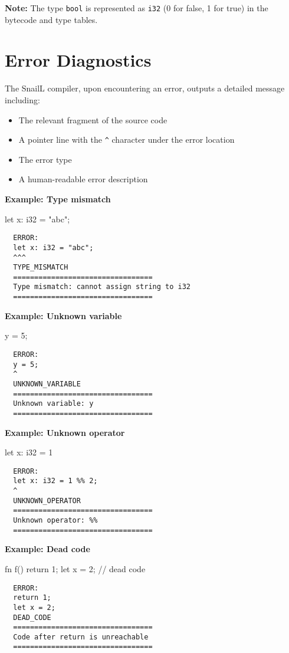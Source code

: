 \documentclass[a4paper,12pt]{article}
\begin{document}
    \textbf{Note:} The type \texttt{bool} is represented as \texttt{i32} (0 for false, 1 for true) in the bytecode and type tables.

    \section{Error Diagnostics}

    The SnailL compiler, upon encountering an error, outputs a detailed message including:
    \begin{itemize}
        \item The relevant fragment of the source code
        \item A pointer line with the \texttt{^} character under the error location
        \item The error type
        \item A human-readable error description
    \end{itemize}

    \textbf{Example: Type mismatch}
    \begin{snailcode}
        let x: i32 = "abc";
    \end{snailcode}
    \begin{verbatim}
  ERROR:
  let x: i32 = "abc";
  ^^^
  TYPE_MISMATCH
  =================================
  Type mismatch: cannot assign string to i32
  =================================
    \end{verbatim}

    \textbf{Example: Unknown variable}
    \begin{snailcode}
        y = 5;
    \end{snailcode}
    \begin{verbatim}
  ERROR:
  y = 5;
  ^
  UNKNOWN_VARIABLE
  =================================
  Unknown variable: y
  =================================
    \end{verbatim}

    \textbf{Example: Unknown operator}
    \begin{snailcode}
        let x: i32 = 1 %
    \end{snailcode}
    \begin{verbatim}
  ERROR:
  let x: i32 = 1 %% 2;
  ^
  UNKNOWN_OPERATOR
  =================================
  Unknown operator: %%
  =================================
    \end{verbatim}

    \textbf{Example: Dead code}
    \begin{snailcode}
        fn f() {
  return 1;
  let x = 2; // dead code
  }
    \end{snailcode}
    \begin{verbatim}
  ERROR:
  return 1;
  let x = 2;
  DEAD_CODE
  =================================
  Code after return is unreachable
  =================================
    \end{verbatim}
\end{document}
